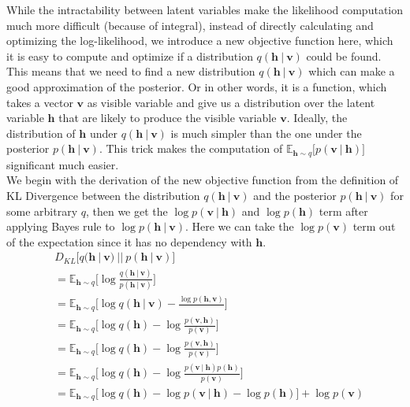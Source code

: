 \documentclass[conference]{IEEEtran}
\begin{document}
While the intractability between latent variables make the likelihood computation much more difficult (because of integral), instead of directly calculating and optimizing the log-likelihood, we introduce a new objective function here, which it is easy to compute and optimize if a distribution $q(\boldsymbol{h}\ |\ \boldsymbol{v})$ could be found. This means that we need to find a new distribution $q(\boldsymbol{h}\ |\ \boldsymbol{v})$ which can make a good approximation of the posterior. Or in other words, it is a function, which takes a vector $\boldsymbol{v}$ as visible variable and give us a distribution over the latent variable $\boldsymbol{h}$ that are likely to produce the visible variable $\boldsymbol{v}$. Ideally, the distribution of $\boldsymbol{h}$ under $q(\boldsymbol{h}\ |\ \boldsymbol{v})$ is much simpler than the one under the posterior $p(\boldsymbol{h}\ |\ \boldsymbol{v})$. This trick makes the computation of $\mathbb{E}_{\boldsymbol{h}\sim q}\bigg[p(\boldsymbol{v}\ |\ \boldsymbol{h})\bigg]$ significant much easier.\\

We begin with the derivation of the new objective function from the definition of KL Divergence between the distribution $q(\boldsymbol{h}\ |\ \boldsymbol{v})$ and the posterior $p(\boldsymbol{h}\ |\ \boldsymbol{v})$ for some arbitrary $q$, then we get the $\log p(\boldsymbol{v}\ |\ \boldsymbol{h})$ and $\log p(\boldsymbol{h})$ term after applying Bayes rule to $\log p(\boldsymbol{h}\ |\ \boldsymbol{v})$. Here we can take the $\log p(\boldsymbol{v})$ term out of the expectation since it has no dependency with $\boldsymbol{h}$.\\
\begin{equation}
  \begin{split}
  	& D_{KL}\bigg[q(\boldsymbol{h}\ |\ \boldsymbol{v})\ ||\ p(\boldsymbol{h}\ |\ \boldsymbol{v})\bigg] \\
  	& = \mathbb{E}_{\boldsymbol{h}\sim q}\bigg[\log \frac{q(\boldsymbol{h}\ |\ \boldsymbol{v})}{p(\boldsymbol{h}\ |\ \boldsymbol{v})}\bigg]\\
  	& = \mathbb{E}_{\boldsymbol{h}\sim q}\bigg[\log q(\boldsymbol{h}\ |\ \boldsymbol{v}) - \frac{\log p(\boldsymbol{h}, \boldsymbol{v})}{}\bigg]\\
    & = \mathbb{E}_{\boldsymbol{h}\sim q}\bigg[\log q(\boldsymbol{h}) - \log \frac{p(\boldsymbol{v},\boldsymbol{h})}{p(\boldsymbol{v})}\bigg]\\
    & = \mathbb{E}_{\boldsymbol{h}\sim q}\bigg[\log q(\boldsymbol{h}) - \log \frac{p(\boldsymbol{v},\boldsymbol{h})}{p(\boldsymbol{v})}\bigg]\\
    & = \mathbb{E}_{\boldsymbol{h}\sim q}\bigg[\log q(\boldsymbol{h}) - \log \frac{p(\boldsymbol{v}\ |\ \boldsymbol{h})p(\boldsymbol{h})}{p(\boldsymbol{v})}\bigg]\\
    & = \mathbb{E}_{\boldsymbol{h}\sim q}\bigg[\log q(\boldsymbol{h}) - \log p(\boldsymbol{v}\ |\ \boldsymbol{h}) - \log p(\boldsymbol{h})\bigg] + \log p(\boldsymbol{v})\\
  \end{split}  
\end{equation}
\end{document}
